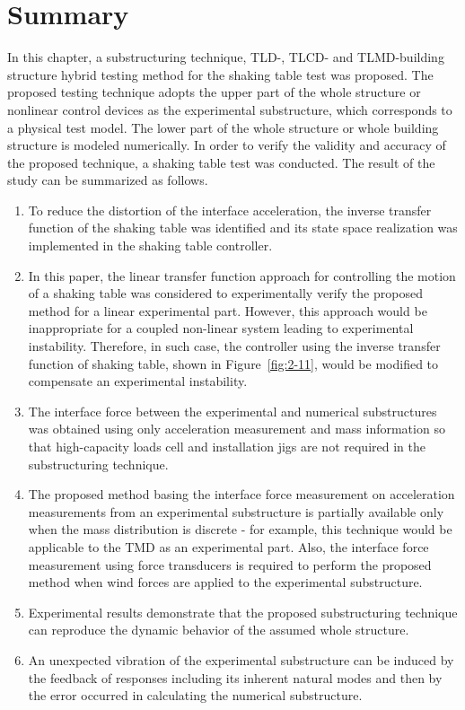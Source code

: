 \section{Summary}
In this chapter, a substructuring technique, TLD-, TLCD- and TLMD-building structure hybrid testing method for the shaking table test was proposed. The proposed testing technique adopts the upper part of the whole structure or nonlinear control devices as the experimental substructure, which corresponds to a physical test model. The lower part of the whole structure or whole building structure is modeled numerically. In order to verify the validity and accuracy of the proposed technique, a shaking table test was conducted. The result of the study can be summarized as follows.
\begin{enumerate}
\item To reduce the distortion of the interface acceleration, the inverse transfer function of the shaking table was identified and its state space realization was implemented in the shaking table controller.
\item In this paper, the linear transfer function approach for controlling the motion of a shaking table was considered to experimentally verify the proposed method for a linear experimental part. However, this approach would be inappropriate for a coupled non-linear system leading to experimental instability. Therefore, in such case, the controller using the inverse transfer function of shaking table, shown in Figure~\ref{fig:2-11}, would be modified to compensate an experimental instability.
\item The interface force between the experimental and numerical substructures was obtained using only acceleration measurement and mass information so that high-capacity loads cell and installation jigs are not required in the substructuring technique.
\item The proposed method basing the interface force measurement on acceleration measurements from an experimental substructure is partially available only when the mass distribution is discrete - for example, this technique would be applicable to the TMD as an experimental part. Also, the interface force measurement using force transducers is required to perform the proposed method when wind forces are applied to the experimental substructure.
\item Experimental results demonstrate that the proposed substructuring technique can reproduce the dynamic behavior of the assumed whole structure.
\item An unexpected vibration of the experimental substructure can be induced by the feedback of responses including its inherent natural modes and then by the error occurred in calculating the numerical substructure.

\end{enumerate}
